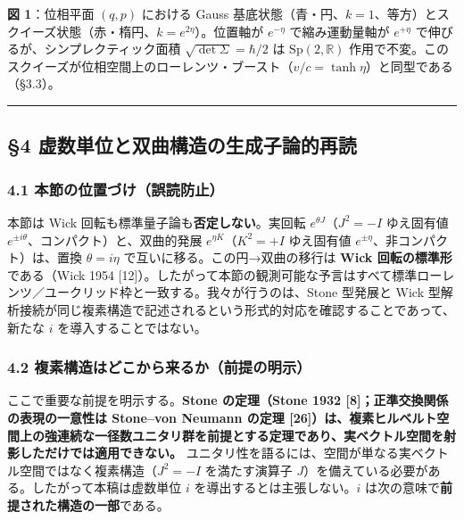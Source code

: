 \documentclass[
]{ltjsarticle}
\begin{document}
\textbf{図 1}：位相平面 \((q,p)\) における Gauss
基底状態（青・円、\(k=1\)、等方）とスクイーズ状態（赤・楕円、\(k=e^{2\eta}\)）。位置軸が
\(e^{-\eta}\) で縮み運動量軸が \(e^{+\eta}\)
で伸びるが、シンプレクティック面積 \(\sqrt{\det\Sigma}=\hbar/2\) は
\(\mathrm{Sp}(2,\mathbb{R})\)
作用で不変。このスクイーズが位相空間上のローレンツ・ブースト（\(v/c=\tanh\eta\)）と同型である（§3.3）。

\begin{center}\rule{0.5\linewidth}{0.5pt}\end{center}

\subsection{§4
虚数単位と双曲構造の生成子論的再読}\label{ux865aux6570ux5358ux4f4dux3068ux53ccux66f2ux69cbux9020ux306eux751fux6210ux5b50ux8ad6ux7684ux518dux8aad}

\subsubsection{4.1
本節の位置づけ（誤読防止）}\label{ux672cux7bc0ux306eux4f4dux7f6eux3065ux3051ux8aa4ux8aadux9632ux6b62}

本節は Wick 回転も標準量子論も\textbf{否定しない}。実回転
\(e^{\theta J}\)（\(J^2=-I\) ゆえ固有値
\(e^{\pm i\theta}\)、コンパクト）と、双曲的発展
\(e^{\eta K}\)（\(K^2=+I\) ゆえ固有値
\(e^{\pm\eta}\)、非コンパクト）は、置換 \(\theta=i\eta\)
で互いに移る。この円→双曲の移行は \textbf{Wick 回転の標準形}である（Wick
1954
{[}12{]}）。したがって本節の観測可能な予言はすべて標準ローレンツ／ユークリッド枠と一致する。我々が行うのは、Stone
型発展と Wick
型解析接続が同じ複素構造で記述されるという形式的対応を確認することであって、新たな
\(i\) を導入することではない。

\subsubsection{4.2
複素構造はどこから来るか（前提の明示）}\label{ux8907ux7d20ux69cbux9020ux306fux3069ux3053ux304bux3089ux6765ux308bux304bux524dux63d0ux306eux660eux793a}

ここで重要な前提を明示する。\textbf{Stone の定理（Stone 1932
{[}8{]}；正準交換関係の表現の一意性は Stone--von Neumann の定理
{[}26{]}）は、複素ヒルベルト空間上の強連続な一径数ユニタリ群を前提とする定理であり、実ベクトル空間を射影しただけでは適用できない。}
ユニタリ性を語るには、空間が単なる実ベクトル空間ではなく複素構造（\(J^2=-I\)
を満たす演算子 \(J\)）を備えている必要がある。したがって本稿は虚数単位
\(i\) を導出するとは主張しない。\(i\)
は次の意味で\textbf{前提された構造の一部}である。
\end{document}
